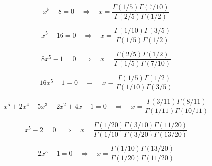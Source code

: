 \documentclass[11pt,a4paper]{article}
\begin{document}
\begin{equation}\label{eq:124}
x^{5} - 8 = 0 \quad \Rightarrow \quad x = \frac{\Gamma(1/5)\Gamma(7/10)}{\Gamma(2/5)\Gamma(1/2)}
\end{equation}

\begin{equation}\label{eq:125}
x^{5} - 16 = 0 \quad \Rightarrow \quad x = \frac{\Gamma(1/10)\Gamma(3/5)}{\Gamma(1/5)\Gamma(1/2)}
\end{equation}

\begin{equation}\label{eq:126}
8x^{5} - 1 = 0 \quad \Rightarrow \quad x = \frac{\Gamma(2/5)\Gamma(1/2)}{\Gamma(1/5)\Gamma(7/10)}
\end{equation}

\begin{equation}\label{eq:127}
16x^{5} - 1 = 0 \quad \Rightarrow \quad x = \frac{\Gamma(1/5)\Gamma(1/2)}{\Gamma(1/10)\Gamma(3/5)}
\end{equation}

\begin{equation}\label{eq:128}
x^{5} + 2x^{4} - 5x^{3} - 2x^{2} + 4x - 1 = 0 \quad \Rightarrow \quad x = \frac{\Gamma(3/11)\Gamma(8/11)}{\Gamma(1/11)\Gamma(10/11)}
\end{equation}

\begin{equation}\label{eq:129}
x^{5} - 2 = 0 \quad \Rightarrow \quad x = \frac{\Gamma(1/20)\Gamma(3/10)\Gamma(11/20)}{\Gamma(1/10)\Gamma(3/20)\Gamma(13/20)}
\end{equation}

\begin{equation}\label{eq:130}
2x^{5} - 1 = 0 \quad \Rightarrow \quad x = \frac{\Gamma(1/10)\Gamma(13/20)}{\Gamma(1/20)\Gamma(11/20)}
\end{equation}
\end{document}
